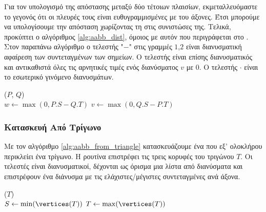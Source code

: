 Για τον υπολογισμό της απόστασης μεταξύ δύο τέτοιων πλαισίων, 
εκμεταλλευόμαστε το γεγονός ότι οι πλευρές τους είναι ευθυγραμμισμένες
με του άξονες.
Έτσι μπορούμε να υπολογίσουμε την απόσταση χωρίζοντας τη στις συνιστώσες της.
Τελικά, προκύπτει ο αλγόριθμος \ref{alg:aabb_dist}, 
όμοιος με αυτόν που περιγράφεται στο \cite{krishnamurthy2011gpu}.
Στον παραπάνω αλγόριθμο  ο τελεστής "$-$" στις γραμμές 
$1$,$2$ είναι διανυσματική αφαίρεση των συντεταγμένων των σημείων.
Ο τελεστής  είναι επίσης διανυσματικός και
αντικαθιστά όλες τις αρνητικές τιμές ενός διανύσματος $v$
με $0$.
Ο τελεστής $\cdot$ είναι το εσωτερικό γινόμενο διανυσμάτων.

\IncMargin{1.5em}
\begin{algorithm}[H]
    \label{alg:aabb_dist}
    \caption[Υπολογισμός Απόστασης δύο ]{
    }
    \DontPrintSemicolon
    \Indm\nonl\funcname($P$, $Q$)\\
    \Indp
        $w \gets \max(0, P.S - Q.T)$\;
        $v \gets \max(0, Q.S - P.T)$\;

    
\end{algorithm}
\DecMargin{1.5em}

\subsubsection{Κατασκευή  Από Τρίγωνο}
Με τον αλγόριθμο \ref{alg:aabb_from_triangle} κατασκευάζουμε 
ένα  που εξ' ολοκλήρου περικλείει ένα τρίγωνο.
Η ρουτίνα  επιστρέφει τις 
τρεις κορυφές του τριγώνου $T$.
Οι τελεστές  είναι διανυσματικοί,
δέχονται ως όρισμα μια λίστα από διανύσματα και επιστρέφουν 
ένα διάνυσμα με τις ελάχιστες/μέγιστες συντεταγμένες ανά άξονα.

\IncMargin{1.5em}
\begin{algorithm}[H]
    \label{alg:aabb_from_triangle}
    \caption[Κατασκευή  από Τρίγωνο]{
    }
    \DontPrintSemicolon
    \Indm\nonl\funcname($T$)\\
    \Indp
        $S \gets \min(\vertices(T))$\;
        $T \gets \max(\vertices(T))$\; 
    
\end{algorithm}
\DecMargin{1.5em}

